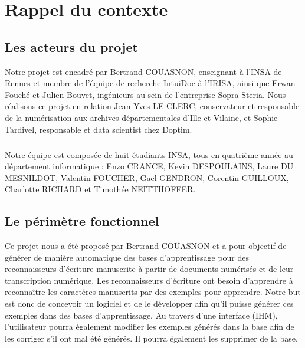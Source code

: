
\chapter{Rappel du contexte}

\section{Les acteurs du projet}

Notre projet est encadré par Bertrand COÜASNON, enseignant à l’INSA de Rennes et membre de l’équipe de recherche IntuiDoc à l’IRISA, ainsi que Erwan Fouché et Julien Bouvet, ingénieurs au sein de l’entreprise Sopra Steria. Nous réalisons ce projet en relation Jean-Yves LE CLERC, conservateur et responsable de la numérisation  aux archives départementales d’Ille-et-Vilaine, et Sophie Tardivel, responsable et data scientist chez Doptim.

\paragraph{}

Notre équipe est composée de huit étudiants INSA, tous en quatrième année au département informatique : Enzo CRANCE, Kevin DESPOULAINS, Laure DU MESNILDOT, Valentin FOUCHER, Gaël GENDRON, Corentin GUILLOUX, Charlotte RICHARD et Timothée NEITTHOFFER.

\section{Le périmètre fonctionnel}

Ce projet nous a été proposé par Bertrand COÜASNON et a pour objectif de générer de manière automatique des bases d’apprentissage pour des reconnaisseurs d’écriture manuscrite à partir de documents numérisés et de leur transcription numérique. Les reconnaisseurs d’écriture ont besoin d’apprendre à reconnaître les caractères manuscrits par des exemples pour apprendre. Notre but est donc de concevoir un logiciel et de le développer afin qu’il puisse générer ces exemples dans des bases d’apprentissage. Au travers d’une interface (IHM), l’utilisateur pourra également modifier les exemples générés dans la base afin de les corriger s’il ont mal été générés. Il pourra également les supprimer de la base.

\paragraph{}

